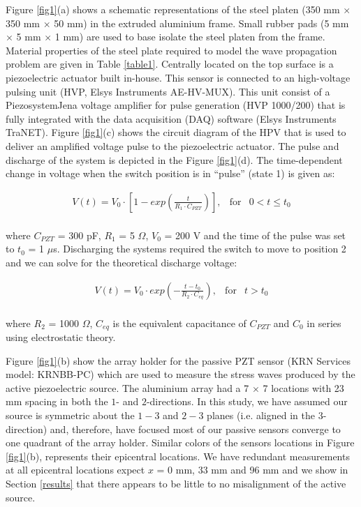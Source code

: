 \documentclass[preprint,3p, 11pt,authoryear]{elsarticle}
\begin{document}
Figure \ref{fig1}(a) shows a schematic representations of the steel platen (350 mm $\times$ 350 mm $\times$ 50 mm) in the extruded aluminium frame. Small rubber pads (5 mm $\times$ 5 mm $\times$ 1 mm) are used to base isolate the steel platen from the frame. Material properties of the steel plate required to model the wave propagation problem are given in Table \ref{table1}. Centrally located on the top surface is a piezoelectric actuator built in-house.  This sensor is connected to an high-voltage pulsing unit (HVP, Elsys Instruments AE-HV-MUX). This unit consist of a PiezosystemJena voltage amplifier for pulse generation (HVP 1000/200) that is fully integrated with the data acquisition (DAQ) software (Elsys Instruments TraNET). Figure \ref{fig1}(c) shows the circuit diagram of the HPV that is used to deliver an amplified voltage pulse to the piezoelectric actuator. The pulse and discharge of the system is depicted in the Figure \ref{fig1}(d). The time-dependent change in voltage when the switch position is in ``pulse'' (state 1) is given as:

\begin{equation}
\begin{array}{lcc}
  V(t) =  V_{0} \cdot \left[ 1 - exp\left(\frac{t}{R_{1}\cdot C_{PZT}} \right) \right], & \text{for} & 0 < t \leq t_{0}\\
\end{array}
\label{eq1}
\end{equation}

\noindent where $C_{PZT}$ = 300 pF, $R_{1}$ = 5 $\Omega$, $V_{0}$ = 200 V and the time of the pulse was set to $t_{0}$ = 1 $\mu$s. Discharging the systems required the switch to move to position 2 and we can solve for the theoretical discharge voltage:

\begin{equation}
\begin{array}{lclcc}
  V(t) =  V_{0} \cdot exp\left(-\frac{t - t_{0}}{R_{2}\cdot C_{eq}}\right), & \text{for} & t > t_{0}\\
\end{array}
\label{eq2}
\end{equation}

\noindent where $R_{2}$ = 1000 $\Omega$, $C_{eq}$ is the equivalent capacitance of $C_{PZT}$ and $C_{0}$ in series using electrostatic theory.  

Figure \ref{fig1}(b) show the array holder for the passive PZT sensor (KRN Services model: KRNBB-PC) which are used to measure the stress waves produced by the active piezoelectric source. The aluminium array had a 7 $\times$ 7 locations with 23 mm spacing in both the $1$- and $2$-directions.  In this study, we have assumed our source is symmetric about the $1-3$ and $2-3$ planes (i.e. aligned in the $3$-direction) and, therefore, have focused most of our passive sensors converge to one quadrant of the array holder.  Similar colors of the sensors locations in Figure \ref{fig1}(b), represents their epicentral locations.  We have redundant measurements at all epicentral locations expect $x$ = 0 mm, 33 mm and 96 mm and we show in Section \ref{results} that there appears to be little to no misalignment of the active source.  
\end{document}
